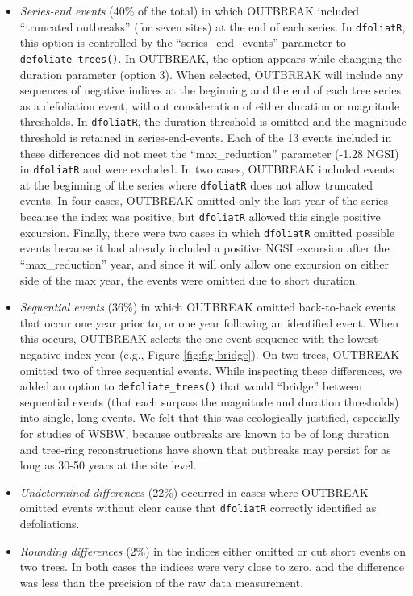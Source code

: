 \documentclass[review]{elsarticle} %
\begin{document}
\begin{itemize}
\item
  \emph{Series-end events} (40\% of the total) in which OUTBREAK included ``truncated outbreaks'' (for seven sites) at the end of each series. In \texttt{dfoliatR}, this option is controlled by the ``series\_end\_events'' parameter to \texttt{defoliate\_trees()}. In OUTBREAK, the option appears while changing the duration parameter (option 3). When selected, OUTBREAK will include any sequences of negative indices at the beginning and the end of each tree series as a defoliation event, without consideration of either duration or magnitude thresholds. In \texttt{dfoliatR}, the duration threshold is omitted and the magnitude threshold is retained in series-end-events. Each of the 13 events included in these differences did not meet the ``max\_reduction'' parameter (-1.28 NGSI) in \texttt{dfoliatR} and were excluded. In two cases, OUTBREAK included events at the beginning of the series where \texttt{dfoliatR} does not allow truncated events. In four cases, OUTBREAK omitted only the last year of the series because the index was positive, but \texttt{dfoliatR} allowed this single positive excursion. Finally, there were two cases in which \texttt{dfoliatR} omitted possible events because it had already included a positive NGSI excursion after the ``max\_reduction'' year, and since it will only allow one excursion on either side of the max year, the events were omitted due to short duration.
\item
  \emph{Sequential events} (36\%) in which OUTBREAK omitted back-to-back events that occur one year prior to, or one year following an identified event. When this occurs, OUTBREAK selects the one event sequence with the lowest negative index year (e.g., Figure \ref{fig:fig-bridge}). On two trees, OUTBREAK omitted two of three sequential events. While inspecting these differences, we added an option to \texttt{defoliate\_trees()} that would ``bridge'' between sequential events (that each surpass the magnitude and duration thresholds) into single, long events. We felt that this was ecologically justified, especially for studies of WSBW, because outbreaks are known to be of long duration and tree-ring reconstructions have shown that outbreaks may persist for as long as 30-50 years at the site level.
\item
  \emph{Undetermined differences} (22\%) occurred in cases where OUTBREAK omitted events without clear cause that \texttt{dfoliatR} correctly identified as defoliations.
\item
  \emph{Rounding differences} (2\%) in the indices either omitted or cut short events on two trees. In both cases the indices were very close to zero, and the difference was less than the precision of the raw data measurement.
\end{itemize}
\end{document}
